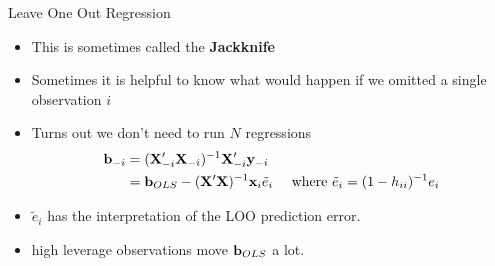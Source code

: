 \documentclass[aspectratio=169,11pt]{beamer}
\begin{document}
\begin{frame}{Leave One Out Regression}
\begin{itemize}
\item This is sometimes called the {\bf Jackknife}
\item Sometimes it is helpful to know what would happen if we omitted a single observation $i$
\item Turns out we don't need to run $N$ regressions
\begin{align*}
{\bf b}_{-i} &= ({\bf X}_{-i}'{\bf X}_{-i})^{-1} {\bf X}_{-i}' {\bf y}_{-i} \\
&={\bf b}_{OLS} -  ({\bf X} '{\bf X})^{-1} {\bf x}_i  \tilde{e}_i  \quad \mbox{ where } \tilde{e}_i = (1-h_{ii})^{-1} e_i
\end{align*}
\item $\tilde{e}_i $ has the interpretation of the LOO prediction error.
\item high leverage observations move ${\bf b}_{OLS}$ a lot.
\end{itemize}
\end{frame}




\end{document}
